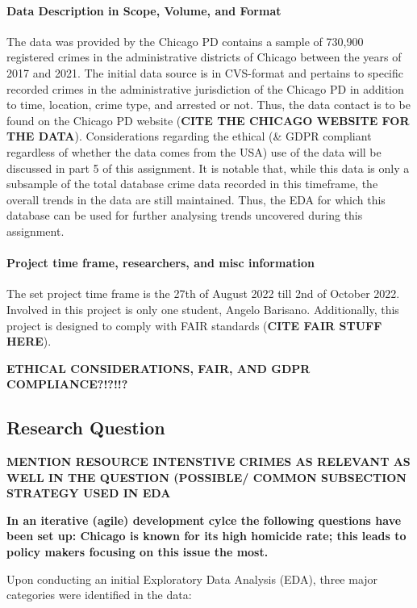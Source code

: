 \documentclass[a4paper]{article}
\begin{document}
\paragraph{Data Description in Scope, Volume, and Format}
The data was provided by the Chicago PD contains a sample of 730,900 registered crimes in the administrative districts of Chicago between the years of 2017 and 2021. The initial data source is in CVS-format and pertains to specific recorded crimes in the administrative jurisdiction of the Chicago PD in addition to time, location, crime type, and arrested or not. Thus, the data contact is to be found on the Chicago PD website (\textbf{CITE THE CHICAGO WEBSITE FOR THE DATA}). Considerations regarding the ethical (\& GDPR compliant regardless of whether the data comes from the USA) use of the data will be discussed in part 5 of this assignment. It is notable that, while this data is only a subsample of the total database crime data recorded in this timeframe, the overall trends in the data are still maintained. Thus, the EDA for which this database can be used for further analysing trends uncovered during this assignment. 

\paragraph{Project time frame, researchers, and misc information} The set project time frame is the 27th of August 2022 till 2nd of October 2022. Involved in this project is only one student, Angelo Barisano. Additionally, this project is designed to comply with FAIR standards (\textbf{CITE FAIR STUFF HERE}).


\textbf{ETHICAL CONSIDERATIONS, FAIR, AND GDPR COMPLIANCE?!?!!?}



\subsection{Research Question}

\textbf{MENTION RESOURCE INTENSTIVE CRIMES AS RELEVANT AS WELL IN THE QUESTION (POSSIBLE/ COMMON SUBSECTION STRATEGY USED IN EDA}

\textbf{In an iterative (agile) development cylce the following questions have been set up: Chicago is known for its high homicide rate; this leads to policy makers focusing on this issue the most. }

Upon conducting an initial Exploratory Data Analysis (EDA), three major categories were identified in the data: 
\end{document}

